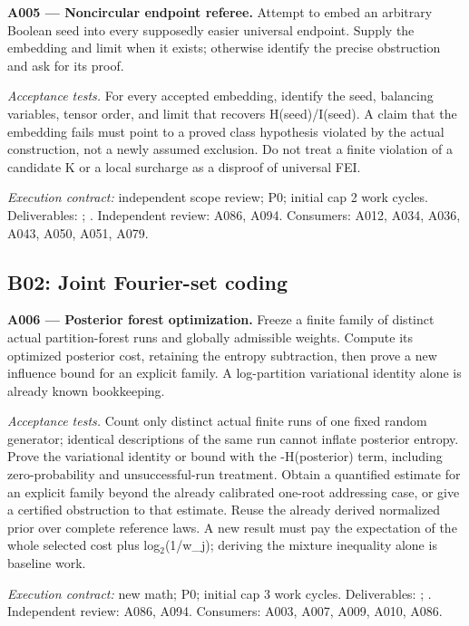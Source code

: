 \documentclass[11pt]{article}
\begin{document}
\textbf{A005 --- Noncircular endpoint referee.} Attempt to embed an arbitrary Boolean seed into every supposedly easier universal endpoint. Supply the embedding and limit when it exists; otherwise identify the precise obstruction and ask for its proof.

\emph{Acceptance tests.} For every accepted embedding, identify the seed, balancing variables, tensor order, and limit that recovers H(seed)/I(seed). A claim that the embedding fails must point to a proved class hypothesis violated by the actual construction, not a newly assumed exclusion. Do not treat a finite violation of a candidate K or a local surcharge as a disproof of universal FEI.

{\small\emph{Execution contract:} independent scope review; P0; initial cap 2 work cycles. Deliverables: ; . Independent review: A086, A094. Consumers: A012, A034, A036, A043, A050, A051, A079.}

\subsection{B02: Joint Fourier-set coding}

\textbf{A006 --- Posterior forest optimization.} Freeze a finite family of distinct actual partition-forest runs and globally admissible weights. Compute its optimized posterior cost, retaining the entropy subtraction, then prove a new influence bound for an explicit family. A log-partition variational identity alone is already known bookkeeping.

\emph{Acceptance tests.} Count only distinct actual finite runs of one fixed random generator; identical descriptions of the same run cannot inflate posterior entropy. Prove the variational identity or bound with the -H(posterior) term, including zero-probability and unsuccessful-run treatment. Obtain a quantified estimate for an explicit family beyond the already calibrated one-root addressing case, or give a certified obstruction to that estimate. Reuse the already derived normalized prior over complete reference laws. A new result must pay the expectation of the whole selected cost plus log$_2$(1/w\_j); deriving the mixture inequality alone is baseline work.

{\small\emph{Execution contract:} new math; P0; initial cap 3 work cycles. Deliverables: ; . Independent review: A086, A094. Consumers: A003, A007, A009, A010, A086.}
\end{document}
